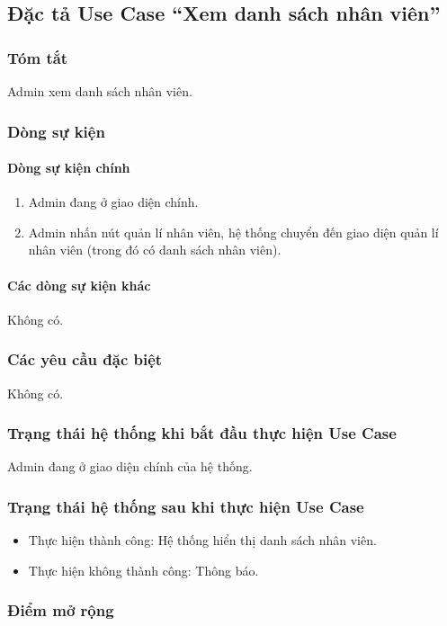 \subsection{Đặc tả Use Case ``Xem danh sách nhân viên''}

\subsubsection{Tóm tắt}
Admin xem danh sách nhân viên.

\subsubsection{Dòng sự kiện}
\paragraph{\textbf{Dòng sự kiện chính}}
\begin{enumerate}
  \item Admin đang ở giao diện chính.
  \item Admin nhấn nút quản lí nhân viên, hệ thống chuyển đến giao diện quản lí nhân viên (trong đó có danh sách nhân viên).
\end{enumerate}

\paragraph{\textbf{Các dòng sự kiện khác}}
Không có.

\subsubsection{Các yêu cầu đặc biệt}
Không có.

\subsubsection{Trạng thái hệ thống khi bắt đầu thực hiện Use Case}
Admin đang ở giao diện chính của hệ thống.

\subsubsection{Trạng thái hệ thống sau khi thực hiện Use Case}
\begin{itemize}
  \item Thực hiện thành công: Hệ thống hiển thị danh sách nhân viên.
  \item Thực hiện không thành công: Thông báo.
\end{itemize}

\subsubsection{Điểm mở rộng}
